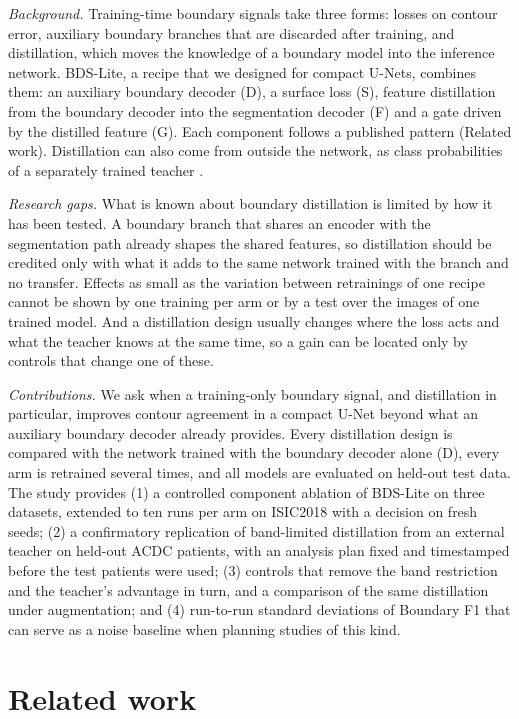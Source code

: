 \documentclass[fleqn,10pt,lineno]{wlpeerj}
\begin{document}
\emph{Background.} Training-time boundary signals take three forms: losses on contour error, auxiliary boundary branches that are discarded after training, and distillation, which moves the knowledge of a boundary model into the inference network. BDS-Lite, a recipe that we designed for compact U-Nets, combines them: an auxiliary boundary decoder (D), a surface loss (S), feature distillation from the boundary decoder into the segmentation decoder (F) and a gate driven by the distilled feature (G). Each component follows a published pattern (Related work). Distillation can also come from outside the network, as class probabilities of a separately trained teacher \citep{Hinton2015Distilling, Liu2024BPKD}.

\emph{Research gaps.} What is known about boundary distillation is limited by how it has been tested. A boundary branch that shares an encoder with the segmentation path already shapes the shared features, so distillation should be credited only with what it adds to the same network trained with the branch and no transfer. Effects as small as the variation between retrainings of one recipe cannot be shown by one training per arm or by a test over the images of one trained model. And a distillation design usually changes where the loss acts and what the teacher knows at the same time, so a gain can be located only by controls that change one of these.

\emph{Contributions.} We ask when a training-only boundary signal, and distillation in particular, improves contour agreement in a compact U-Net beyond what an auxiliary boundary decoder already provides. Every distillation design is compared with the network trained with the boundary decoder alone (D), every arm is retrained several times, and all models are evaluated on held-out test data. The study provides (1) a controlled component ablation of BDS-Lite on three datasets, extended to ten runs per arm on ISIC2018 with a decision on fresh seeds; (2) a confirmatory replication of band-limited distillation from an external teacher on held-out ACDC patients, with an analysis plan fixed and timestamped before the test patients were used; (3) controls that remove the band restriction and the teacher's advantage in turn, and a comparison of the same distillation under augmentation; and (4) run-to-run standard deviations of Boundary F1 that can serve as a noise baseline when planning studies of this kind.

\section*{Related work}
\end{document}

